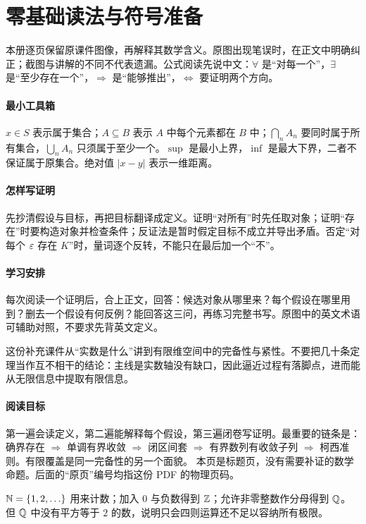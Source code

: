 \section*{零基础读法与符号准备}
本册逐页保留原课件图像，再解释其数学含义。原图出现笔误时，在正文中明确纠正；截图与讲解的不同不代表遗漏。公式阅读先说中文：$\forall$ 是“对每一个”，$\exists$ 是“至少存在一个”，$\Rightarrow$ 是“能够推出”，$\Leftrightarrow$ 要证明两个方向。

\paragraph{最小工具箱}$x\in S$ 表示属于集合；$A\subseteq B$ 表示 $A$ 中每个元素都在 $B$ 中；$\bigcap_n A_n$ 要同时属于所有集合，$\bigcup_n A_n$ 只须属于至少一个。$\sup$ 是最小上界，$\inf$ 是最大下界，二者不保证属于原集合。绝对值 $|x-y|$ 表示一维距离。

\paragraph{怎样写证明}先抄清假设与目标，再把目标翻译成定义。证明“对所有”时先任取对象；证明“存在”时要构造对象并检查条件；反证法是暂时假定目标不成立并导出矛盾。否定“对每个 $\varepsilon$ 存在 $K$”时，量词逐个反转，不能只在最后加一个“不”。

\paragraph{学习安排}每次阅读一个证明后，合上正文，回答：候选对象从哪里来？每个假设在哪里用到？删去一个假设有何反例？能回答这三问，再练习完整书写。原图中的英文术语可辅助对照，不要求先背英文定义。


这份补充课件从“实数是什么”讲到有限维空间中的完备性与紧性。不要把几十条定理当作互不相干的结论：主线是实数轴没有缺口，因此逼近过程有落脚点，进而能从无限信息中提取有限信息。
\paragraph{阅读目标}第一遍会读定义，第二遍能解释每个假设，第三遍闭卷写证明。最重要的链条是：确界存在 $\Rightarrow$ 单调有界收敛 $\Rightarrow$ 闭区间套 $\Rightarrow$ 有界数列有收敛子列 $\Rightarrow$ 柯西准则。有限覆盖是同一完备性的另一个面貌。
本页是标题页，没有需要补证的数学命题。后面的“原页”编号均指这份 PDF 的物理页码。

$\mathbb{N}=\{1,2,\ldots\}$ 用来计数；加入 $0$ 与负数得到 $\mathbb{Z}$；允许非零整数作分母得到 $\mathbb{Q}$。但 $\mathbb{Q}$ 中没有平方等于 $2$ 的数，说明只会四则运算还不足以容纳所有极限。
